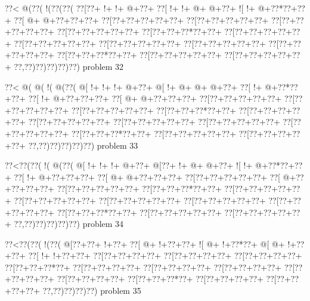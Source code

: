 \vbox{\vbox{\goo
\0??<\- @(\0??(\- !(\0??(\0??(
\0??[\0??+\- !+\- !+\- @+\0??+
\0??[\- !+\- !+\- @+\- @+\0??+
\- ![\- !+\- @+\0??*\0??+\0??+
\0??[\- @+\- @+\0??+\0??+\0??+
\0??[\0??+\0??+\0??+\0??+\0??+
\0??[\0??+\0??+\0??+\0??+\0??+
\0??[\0??+\0??+\0??+\0??+\0??+
\0??[\0??+\0??+\0??+\0??+\0??+
\0??[\0??+\0??+\0??*\0??+\0??+
\0??[\0??+\0??+\0??+\0??+\0??+
\0??[\0??+\0??+\0??+\0??+\0??+
\0??[\0??+\0??+\0??+\0??+\0??+
\0??[\0??+\0??+\0??+\0??+\0??+
\0??[\0??+\0??+\0??+\0??+\0??+
\0??[\0??+\0??+\0??*\0??+\0??+
\0??[\0??+\0??+\0??+\0??+\0??+
\0??[\0??+\0??+\0??+\0??+\0??+
\0??,\0??)\0??)\0??)\0??)\0??)
}
\hfil problem 32\hfil\break
}

\vbox{\vbox{\goo
\0??<\- @(\- @(\- !(\- @(\0??(
\- @[\- !+\- !+\- !+\- @+\0??+
\- @[\- !+\- @+\- @+\- @+\0??+
\0??[\- !+\- @+\0??*\0??+\0??+
\0??[\- !+\- @+\0??+\0??+\0??+
\0??[\- @+\- @+\0??+\0??+\0??+
\0??[\0??+\0??+\0??+\0??+\0??+
\0??[\0??+\0??+\0??+\0??+\0??+
\0??[\0??+\0??+\0??+\0??+\0??+
\0??[\0??+\0??+\0??*\0??+\0??+
\0??[\0??+\0??+\0??+\0??+\0??+
\0??[\0??+\0??+\0??+\0??+\0??+
\0??[\0??+\0??+\0??+\0??+\0??+
\0??[\0??+\0??+\0??+\0??+\0??+
\0??[\0??+\0??+\0??+\0??+\0??+
\0??[\0??+\0??+\0??*\0??+\0??+
\0??[\0??+\0??+\0??+\0??+\0??+
\0??[\0??+\0??+\0??+\0??+\0??+
\0??,\0??)\0??)\0??)\0??)\0??)
}
\hfil problem 33\hfil\break
}

\vbox{\vbox{\goo
\0??<\0??(\0??(\- !(\- @(\0??(
\- @[\- !+\- !+\- !+\- @+\0??+
\- @[\0??+\- !+\- @+\- @+\0??+
\- ![\- !+\- @+\0??*\0??+\0??+
\0??[\- !+\- @+\0??+\0??+\0??+
\0??[\- @+\- @+\0??+\0??+\0??+
\0??[\0??+\0??+\0??+\0??+\0??+
\0??[\- @+\0??+\0??+\0??+\0??+
\0??[\0??+\0??+\0??+\0??+\0??+
\0??[\0??+\0??+\0??*\0??+\0??+
\0??[\0??+\0??+\0??+\0??+\0??+
\0??[\0??+\0??+\0??+\0??+\0??+
\0??[\0??+\0??+\0??+\0??+\0??+
\0??[\0??+\0??+\0??+\0??+\0??+
\0??[\0??+\0??+\0??+\0??+\0??+
\0??[\0??+\0??+\0??*\0??+\0??+
\0??[\0??+\0??+\0??+\0??+\0??+
\0??[\0??+\0??+\0??+\0??+\0??+
\0??,\0??)\0??)\0??)\0??)\0??)
}
\hfil problem 34\hfil\break
}

\vbox{\vbox{\goo
\0??<\0??(\0??(\- !(\0??(
\- @[\0??+\0??+\- !+\0??+
\0??[\- @+\- !+\0??+\0??+
\- ![\- @+\- !+\0??*\0??+
\- @[\- @+\- !+\0??+\0??+
\0??[\- !+\- !+\0??+\0??+
\0??[\0??+\0??+\0??+\0??+
\0??[\0??+\0??+\0??+\0??+
\0??[\0??+\0??+\0??+\0??+
\0??[\0??+\0??+\0??*\0??+
\0??[\0??+\0??+\0??+\0??+
\0??[\0??+\0??+\0??+\0??+
\0??[\0??+\0??+\0??+\0??+
\0??[\0??+\0??+\0??+\0??+
\0??[\0??+\0??+\0??+\0??+
\0??[\0??+\0??+\0??*\0??+
\0??[\0??+\0??+\0??+\0??+
\0??[\0??+\0??+\0??+\0??+
\0??,\0??)\0??)\0??)\0??)
}
\hfil problem 35\hfil\break
}

